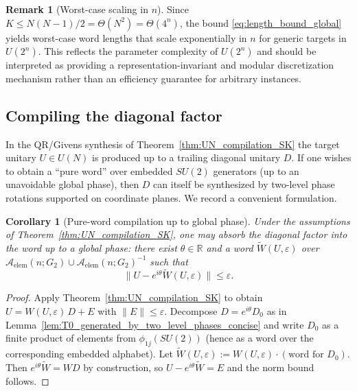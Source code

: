 \documentclass{article}%
\newtheorem{corollary}[theorem]{Corollary}
\theoremstyle{definition}
\newtheorem{remark}[theorem]{Remark}
\numberwithin{equation}{section}
\begin{document}
\begin{remark}[Worst-case scaling in $n$]\label{rem:worst_case_scaling}
Since $K\le N(N-1)/2=\Theta(N^2)=\Theta(4^n)$, the bound \eqref{eq:length_bound_global} yields worst-case word lengths that scale
exponentially in $n$ for generic targets in $U(2^n)$. This reflects the parameter complexity of $U(2^n)$ and should be interpreted
as providing a representation-invariant and modular discretization mechanism rather than an efficiency guarantee for arbitrary
instances.
\end{remark}

\subsection{Compiling the diagonal factor}
\label{subsec:compile_diagonal_optional}

In the QR/Givens synthesis of Theorem~\ref{thm:UN_compilation_SK} the target unitary $U\in U(N)$ is produced up to a trailing diagonal
unitary $D$. If one wishes to obtain a ``pure word'' over embedded $SU(2)$ generators (up to an unavoidable global phase), then $D$ can
itself be synthesized by two-level phase rotations supported on coordinate planes. We record a convenient formulation.


\begin{corollary}[Pure-word compilation up to global phase]
\label{cor:pure_word_compilation}
Under the assumptions of Theorem~\ref{thm:UN_compilation_SK}, one may absorb the diagonal factor into the word up to a global phase:
there exist $\theta\in\mathbb{R}$ and a word $\widetilde W(U,\varepsilon)$ over
$\mathcal{A}_{\mathrm{elem}}(n;G_2)\cup\mathcal{A}_{\mathrm{elem}}(n;G_2)^{-1}$ such that
\[
\big\|U-e^{i\theta}\widetilde W(U,\varepsilon)\big\|\le \varepsilon.
\]
\end{corollary}

\begin{proof}
Apply Theorem~\ref{thm:UN_compilation_SK} to obtain $U=W(U,\varepsilon)\,D+E$ with $\|E\|\le\varepsilon$.
Decompose $D=e^{i\theta}D_0$ as in Lemma~\ref{lem:T0_generated_by_two_level_phases_concise} and write $D_0$ as a finite product of
elements from $\phi_{1j}(SU(2))$ (hence as a word over the corresponding embedded alphabet).
Let $\widetilde W(U,\varepsilon):=W(U,\varepsilon)\cdot(\text{word for }D_0)$. Then $e^{i\theta}\widetilde W=W D$ by construction, so
$U-e^{i\theta}\widetilde W=E$ and the norm bound follows.
\end{proof}
\end{document}
